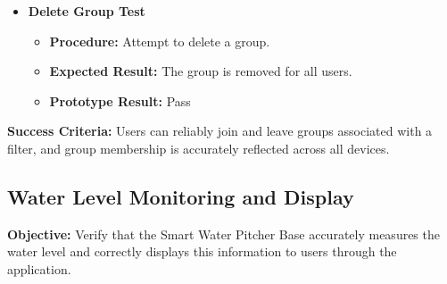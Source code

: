 \begin{itemize}
\item \textbf{Delete Group Test}
\begin{itemize}
\item \textbf{Procedure:} Attempt to delete a group.
\item \textbf{Expected Result:} The group is removed for all users.
\item \textbf{Prototype Result:} Pass
\end{itemize}

\end{itemize}

\noindent{}\textbf{Success Criteria:}
Users can reliably join and leave groups associated with a filter, and group membership is accurately reflected across all devices.



\subsection*{Water Level Monitoring and Display}

\noindent{}\textbf{Objective:}
Verify that the Smart Water Pitcher Base accurately measures the water level and correctly displays this information to users through the application.\\

